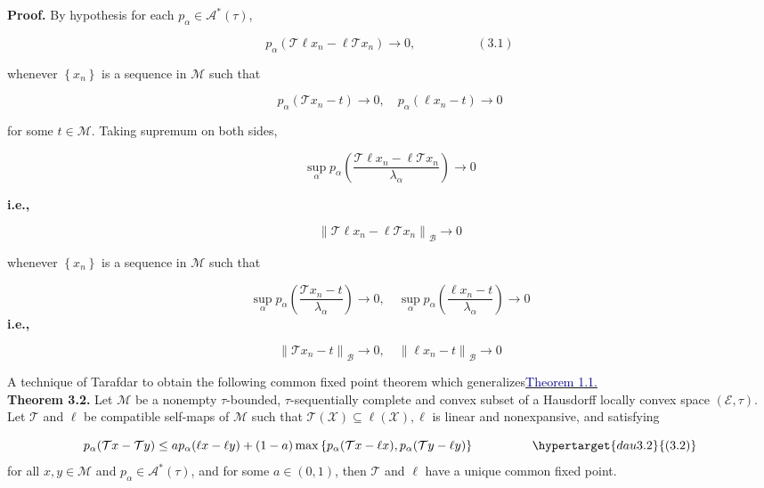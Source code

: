 \documentclass[12pt,a4paper,two side]{article}
\begin{document}
\textbf{Proof.} By hypothesis for each $p_\alpha \in \mathcal{A}^*(\tau)$,

$$
p_\alpha\left(\mathcal{T} \ell x_n-\ell \mathcal{T} x_n\right) \rightarrow 0,  \ \ \ \ \ \ \ \ \ \ \  \ \ \ \ \ \ \ \ \ \ \ (3.1)
$$ 

whenever $\left\{x_n\right\}$ is a sequence in $\mathcal{M}$ such that

$$
p_\alpha\left(\mathcal{T} x_n-t\right) \rightarrow 0, \quad p_\alpha\left(\ell x_n-t\right) \rightarrow 0
$$

for some $t \in \mathcal{M}$.
Taking supremum on both sides,

$$
\sup _\alpha p_\alpha\left(\frac{\mathcal{T} \ell x_n-\ell \mathcal{T} x_n}{\lambda_\alpha}\right) \rightarrow 0
$$

\textbf{i.e.,}

$$
\left\|\mathcal{T} \ell x_n-\ell \mathcal{T} x_n\right\|_{\mathcal{B}} \rightarrow 0
$$

whenever $\left\{x_n\right\}$ is a sequence in $\mathcal{M}$ such that

$$
\sup _\alpha p_\alpha\left(\frac{\mathcal{T} x_n-t}{\lambda_\alpha}\right) \rightarrow 0, \quad \sup _\alpha p_\alpha\left(\frac{\ell x_n-t}{\lambda_\alpha}\right) \rightarrow 0
$$
\textbf{i.e.,}

$$
\left\|\mathcal{T} x_n-t\right\|_{\mathscr{B}} \rightarrow 0, \quad\left\|\ell x_n-t\right\|_{\mathcal{B}} \rightarrow 0
$$


A technique of Tarafdar \cite{citation-key10} to obtain the following common fixed point theorem which generalizes\hyperlink{muc1.1}{{\textcolor{Darkblue}{Theorem 1.1.}}}\\

\textbf{Theorem 3.2.} Let $\mathcal{M}$ be a nonempty $\tau$-bounded, $\tau$-sequentially complete and convex subset of a Hausdorff locally convex space $(\mathcal{E}, \tau)$. Let $\mathcal{T}$ and $\ell$ be compatible self-maps of $\mathcal{M}$ such that $\mathcal{T}(\mathcal{X}) \subseteq \ell(\mathcal{X}), \ell$ is linear and nonexpansive, and satisfying

$$
p_\alpha(\mathcal{T} x-\mathcal{T} y) \leq a p_\alpha(\ell x-\ell y)+(1-a) \max \left\{p_\alpha(\mathcal{T} x-\ell x), p_\alpha(\mathcal{T} y-\ell y)\right\} \ \ \ \ \ \ \ \ \ \ \  \ \ \  \hypertarget{dau3.2}{(3.2)}
$$
for all $x, y \in \mathcal{M}$ and $p_\alpha \in \mathcal{A}^*(\tau)$, and for some $a \in(0,1)$, then $\mathcal{T}$ and $\ell$ have a unique common fixed point.\\
\end{document}

